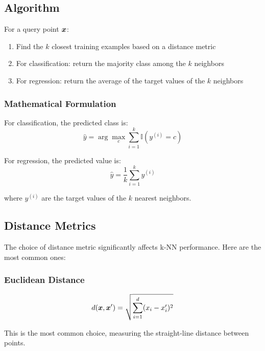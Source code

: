 \subsection{Algorithm}

For a query point $\boldsymbol{x}$:

\begin{enumerate}
    \item Find the $k$ closest training examples based on a distance metric
    \item For classification: return the majority class among the $k$ neighbors
    \item For regression: return the average of the target values of the $k$ neighbors
\end{enumerate}

\subsubsection{Mathematical Formulation}

For classification, the predicted class is:
\begin{equation}
\hat{y} = \arg\max_{c} \sum_{i=1}^{k} \mathbb{I}(y^{(i)} = c)
\end{equation}

For regression, the predicted value is:
\begin{equation}
\hat{y} = \frac{1}{k} \sum_{i=1}^{k} y^{(i)}
\end{equation}

where $y^{(i)}$ are the target values of the $k$ nearest neighbors.

\subsection{Distance Metrics}

The choice of distance metric significantly affects k-NN performance. Here are the most common ones:

\subsubsection{Euclidean Distance}

\begin{equation}
d(\boldsymbol{x}, \boldsymbol{x}') = \sqrt{\sum_{i=1}^{d} (x_i - x_i')^2}
\end{equation}

This is the most common choice, measuring the straight-line distance between points.

